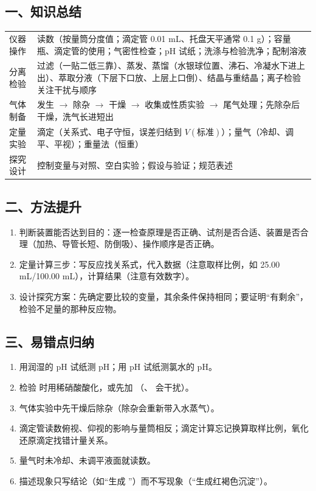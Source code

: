 \subsection*{一、知识总结}
\begin{center}
\small
\begin{tabularx}{\linewidth}{p{2.2cm}X}
\toprule
仪器操作 & 读数（按量筒分度值；滴定管 0.01 mL、托盘天平通常 0.1 g）；容量瓶、滴定管的使用；气密性检查；pH 试纸；洗涤与检验洗净；配制溶液 \\
分离检验 & 过滤（一贴二低三靠）、蒸发、蒸馏（水银球位置、沸石、冷凝水下进上出）、萃取分液（下层下口放、上层上口倒）、结晶与重结晶；离子检验关注干扰与顺序 \\
气体制备 & 发生 $\to$ 除杂 $\to$ 干燥 $\to$ 收集或性质实验 $\to$ 尾气处理；先除杂后干燥，洗气长进短出 \\
定量实验 & 滴定（关系式、电子守恒，误差归结到 $V(\text{标准})$）；量气（冷却、调平、平视）；重量法（恒重） \\
探究设计 & 控制变量与对照、空白实验；假设与验证；规范表述 \\
\bottomrule
\end{tabularx}
\end{center}
\subsection*{二、方法提升}
\begin{enumerate}
\item 判断装置能否达到目的：逐一检查原理是否正确、试剂是否合适、装置是否合理（加热、导管长短、防倒吸）、操作顺序是否正确。
\item 定量计算三步：写反应找关系式，代入数据（注意取样比例，如 25.00 mL/100.00 mL），计算结果（注意有效数字）。
\item 设计探究方案：先确定要比较的变量，其余条件保持相同；要证明“有剩余”，检验不足量的那种反应物。
\end{enumerate}
\subsection*{三、易错点归纳}
\begin{enumerate}
\item 用润湿的 pH 试纸测 pH；用 pH 试纸测氯水的 pH。
\item 检验  时用稀硝酸酸化，或先加 （、 会干扰）。
\item 气体实验中先干燥后除杂（除杂会重新带入水蒸气）。
\item 滴定管读数俯视、仰视的影响与量筒相反；滴定计算忘记换算取样比例，氧化还原滴定找错计量关系。
\item 量气时未冷却、未调平液面就读数。
\item 描述现象只写结论（如“生成 ”）而不写现象（“生成红褐色沉淀”）。
\end{enumerate}

